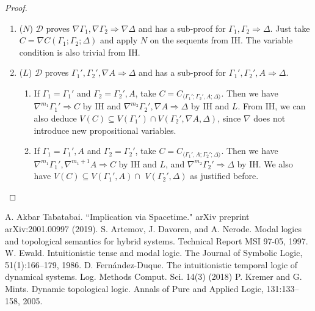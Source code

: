 \documentclass[12pt,a4paper]{article}
\theoremstyle{plain}
\theoremstyle{definition}
\begin{document}
\begin{proof}
\begin{enumerate}
		\item ($N$) $\mathcal{D}$ proves $\nabla \Gamma_1 , \nabla \Gamma_2 \Rightarrow \nabla \Delta$ and has a sub-proof for $\Gamma_1 , \Gamma_2 \Rightarrow \Delta$. Just take $C = \nabla C(\Gamma_1;\Gamma_2;\Delta)$ and apply $N$ on the sequents from IH. The variable condition is also trivial from IH.
		
		\item ($L$) $\mathcal{D}$ proves $\Gamma_1' , \Gamma_2' , \nabla A \Rightarrow \Delta$ and has a sub-proof for $\Gamma_1' , \Gamma_2' , A \Rightarrow \Delta$.
		\begin{enumerate}
			\item If $\Gamma_1 = \Gamma_1'$ and $\Gamma_2 = \Gamma_2' , A$, take $C = C_{\langle\Gamma_1';\Gamma_2',A;\Delta\rangle}$. Then we have $\nabla^{m_1} \Gamma_1' \Rightarrow C$ by IH and $\nabla^{m_2}\Gamma_2' , \nabla A \Rightarrow \Delta$ by IH and $L$. From IH, we can also deduce $V(C) \subseteq V(\Gamma_1') \cap V(\Gamma_2',\nabla A,\Delta)$, since $\nabla$ does not introduce new propositional variables.
			
			\item If $\Gamma_1 = \Gamma_1' , A$ and $\Gamma_2 = \Gamma_2'$, take $C = C_{\langle\Gamma_1',A;\Gamma_2';\Delta\rangle}$. Then we have $\nabla^{m_1}\Gamma_1', \nabla^{m_1+1}A \Rightarrow C$ by IH and $L$, and $\nabla^{m_2}\Gamma_2' \Rightarrow \Delta$ by IH. We also have $V(C) \subseteq V(\Gamma_1',A) \cap$ $V(\Gamma_2',\Delta)$ as justified before.
		\end{enumerate}
	\end{enumerate}
\end{proof}

\begin{thebibliography}{99}

A. Akbar Tabatabai. ``Implication via Spacetime." arXiv preprint arXiv:2001.00997 (2019).
S. Artemov, J. Davoren, and A. Nerode. Modal logics and topological semantics for hybrid systems. Technical Report MSI 97-05, 1997.
W. Ewald. Intuitionistic tense and modal logic. The Journal of Symbolic Logic, 51(1):166–179, 1986.
D. Fernández-Duque. The intuitionistic temporal logic of dynamical systems. Log. Methods Comput. Sci. 14(3) (2018)
P. Kremer and G. Mints. Dynamic topological logic. Annals of Pure and Applied Logic, 131:133–158, 2005.

\end{thebibliography}
\end{document}

